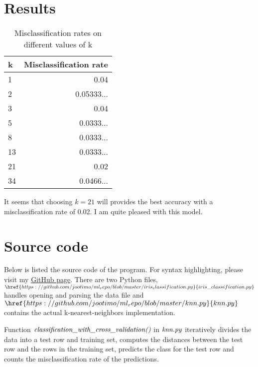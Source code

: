\documentclass[a4paper]{article}
\begin{document}
  \section{Results}
  \begin{table}[h]
  \centering
  \begin{tabular}{l|r}
  k & Misclassification rate \\\hline
  1 & 0.04\\
  2 & 0.05333...\\
  3 & 0.04\\
  5 & 0.0333...\\
  8 & 0.0333...\\
  13 & 0.0333...\\
  21 & 0.02\\
  34 & 0.0466...
  \end{tabular}

  \caption{\label{tab:widgets}Misclassification rates on different values of k}
  \end{table}
  \noindent
  It seems that choosing $k=21$ will provides the best accuracy with a misclassification rate of 0.02. I am quite pleased with this model.

  \section{Source code}
  Below is listed the source code of the program. For syntax highlighting, please visit my \href{https://github.com/jootimo/ml_repo}{GitHub page}. There are two Python files, $\href{https://github.com/jootimo/ml_repo/blob/master/iris_classification.py}{iris\_classification.py}$ handles opening and parsing the data file and $\href{https://github.com/jootimo/ml_repo/blob/master/knn.py}{knn.py}$ contains the actual k-nearest-neighbors implementation. 

  Function  $\emph{classification\_with\_cross\_validation()}$ in $\emph{knn.py}$ iteratively divides the data into a test row and training set, computes the distances between the test row and the rows in the training set, predicts the class for the test row and counts the misclassification rate of the predictions. \\\\


  \renewcommand{\sfdefault}{pcr}
  \selectfont
\end{document}
